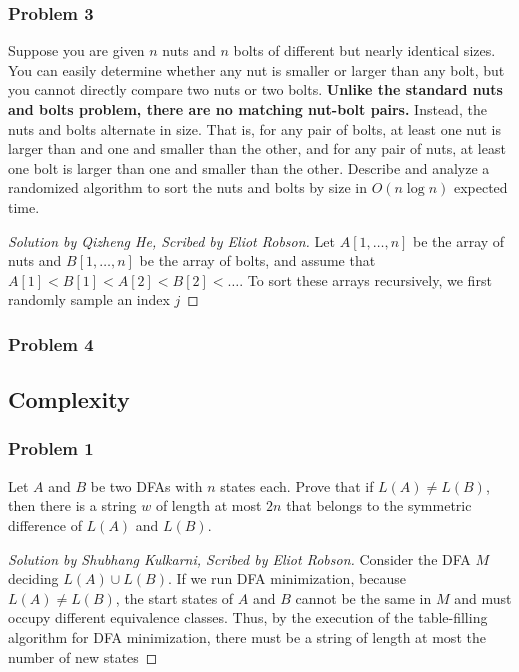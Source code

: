 \documentclass{article}
\newenvironment{scribed}[2]{\begin{proof}[Solution by #1, Scribed by #2]}{\end{proof}}
\begin{document}
\subsubsection{Problem 3}
Suppose you are given \(n\) nuts and \(n\) bolts of different but nearly identical sizes. You can easily determine whether any nut is smaller or larger than any bolt, but you cannot directly compare two nuts or two bolts. \textbf{Unlike the standard nuts and bolts problem, there are no matching nut-bolt pairs.} Instead, the nuts and bolts alternate in size. That is, for any pair of bolts, at least one nut is larger than and one and smaller than the other, and for any pair of nuts, at least one bolt is larger than one and smaller than the other. Describe and analyze a randomized algorithm to sort the nuts and bolts by size in \(O(n \log n)\) expected time.

\begin{scribed}{Qizheng He}{Eliot Robson}
    Let \(A[1, \dots, n]\) be the array of nuts and \(B[1, \dots, n]\) be the array of bolts, and assume that \(A[1] < B[1] < A[2] < B[2] < \dots\). To sort these arrays recursively, we first randomly sample an index \(j\)
\end{scribed}

\subsubsection{Problem 4}

\subsection{Complexity}

\subsubsection{Problem 1}
Let \(A\) and \(B\) be two DFAs with \(n\) states each. Prove that if \(L(A) \neq L(B)\), then there is a string \(w\) of length at most \(2n\) that belongs to the symmetric difference of \(L(A)\) and \(L(B)\).

\begin{scribed}{Shubhang Kulkarni}{Eliot Robson}
	Consider the DFA \(M\) deciding \(L(A) \cup L(B)\). If we run DFA minimization, because \(L(A) \neq L(B)\), the start states of \(A\) and \(B\) cannot be the same in \(M\) and must occupy different equivalence classes. Thus, by the execution of the table-filling algorithm for DFA minimization, there must be a string of length at most the number of new states 
\end{scribed}
\end{document}
